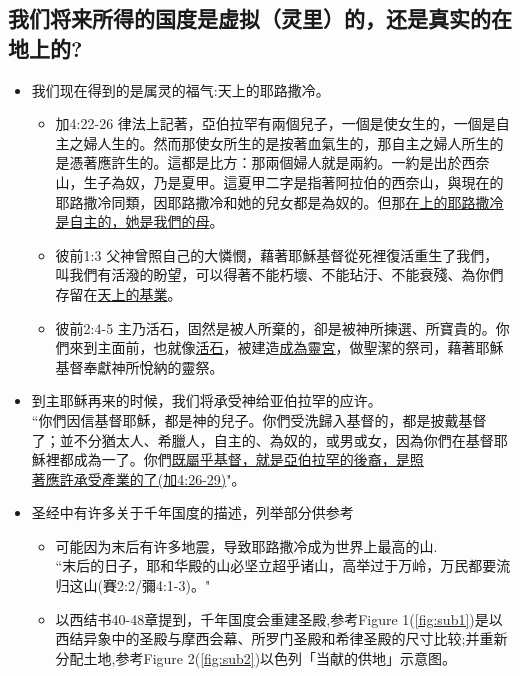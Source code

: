 \subsection{我们将来所得的国度是虚拟（灵里）的，还是真实的在地上的?}
\begin{itemize}[noitemsep]
\item 我们现在得到的是属灵的福气:天上的耶路撒冷。
\begin{itemize}[noitemsep]
\item 加4:22-26 律法上記著，亞伯拉罕有兩個兒子，一個是使女生的，一個是自主之婦人生的。然而那使女所生的是按著血氣生的，那自主之婦人所生的是憑著應許生的。這都是比方：那兩個婦人就是兩約。一約是出於西奈山，生子為奴，乃是夏甲。這夏甲二字是指著阿拉伯的西奈山，與現在的耶路撒冷同類，因耶路撒冷和她的兒女都是為奴的。但那\underline{在上的耶路撒冷是自主的，她是我們的母}。
\item 彼前1:3 父神曾照自己的大憐憫，藉著耶穌基督從死裡復活重生了我們，叫我們有活潑的盼望，可以得著不能朽壞、不能玷汙、不能衰殘、為你們存留在\underline{天上的基業}。
\item 彼前2:4-5 主乃活石，固然是被人所棄的，卻是被神所揀選、所寶貴的。你們來到主面前，也就像\underline{活石}，被建造\underline{成為靈宮}，做聖潔的祭司，藉著耶穌基督奉獻神所悅納的靈祭。
\end{itemize}
\item 到主耶稣再来的时候，我们将承受神给亚伯拉罕的应许。\\
“你們因信基督耶穌，都是神的兒子。你們受洗歸入基督的，都是披戴基督了；並不分猶太人、希臘人，自主的、為奴的，或男或女，因為你們在基督耶穌裡都成為一了。你們\underline{既屬乎基督，就是亞伯拉罕的後裔，是照}\\
\underline{著應許承受產業的了(加4:26-29)}"。
\item 圣经中有许多关于千年国度的描述，列举部分供参考
\begin{itemize}[noitemsep]
\item 可能因为末后有许多地震，导致耶路撒冷成为世界上最高的山.\\
“末后的日子，耶和华殿的山必坚立超乎诸山，高举过于万岭，万民都要流归这山(賽2:2/彌4:1-3)。"
\item 以西结书40-48章提到，千年国度会重建圣殿,参考Figure 1(\ref{fig:sub1})是以西结异象中的圣殿与摩西会幕、所罗门圣殿和希律圣殿的尺寸比较;并重新分配土地,参考Figure 2(\ref{fig:sub2})以色列「当献的供地」示意图。

\end{itemize}
\end{itemize}
